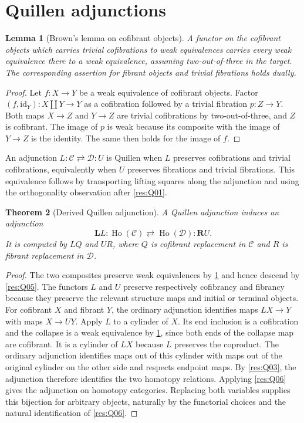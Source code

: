 \documentclass[11pt,oneside,openany]{book}
\newtheorem{theorem}{Theorem}[chapter]
\newtheorem{lemma}[theorem]{Lemma}
\theoremstyle{definition}
\theoremstyle{remark}
\begin{document}
\section{Quillen adjunctions}

\begin{lemma}[Brown's lemma on cofibrant objects]\label{res:Q07}
A functor on the cofibrant objects which carries trivial
cofibrations to weak equivalences carries every weak
equivalence there to a weak equivalence, assuming two-out-of-three
in the target. The corresponding assertion for fibrant
objects and trivial fibrations holds dually.
\end{lemma}
\begin{proof}
Let \(f:X\to Y\) be a weak equivalence of cofibrant objects.
Factor \((f,\mathrm{id}_Y):X\amalg Y\to Y\) as a
cofibration followed by a trivial fibration \(p:Z\to Y\).
Both maps \(X\to Z\) and \(Y\to Z\) are trivial
cofibrations by two-out-of-three, and \(Z\) is cofibrant.
The image of \(p\) is weak because its composite with
the image of \(Y\to Z\) is the identity. The same then
holds for the image of \(f\).
\end{proof}

An adjunction \(L:\mathcal C\rightleftarrows\mathcal D:U\)
is Quillen when \(L\) preserves cofibrations and trivial
cofibrations, equivalently when \(U\) preserves fibrations
and trivial fibrations. This equivalence follows by
transporting lifting squares along the adjunction and
using the orthogonality observation after \ref{res:Q01}.

\begin{theorem}[Derived Quillen adjunction]\label{res:Q08}
A Quillen adjunction induces an adjunction
\[
 \mathbf L L:\operatorname{Ho}(\mathcal C)
 \rightleftarrows \operatorname{Ho}(\mathcal D):\mathbf R U.
\]
It is computed by \(LQ\) and \(UR\), where \(Q\) is
cofibrant replacement in \(\mathcal C\) and \(R\)
is fibrant replacement in \(\mathcal D\).
\end{theorem}
\begin{proof}
The two composites preserve weak equivalences by
\ref{res:Q07} and hence descend by \ref{res:Q05}.
The functors \(L\) and \(U\) preserve respectively
cofibrancy and fibrancy because they preserve the relevant
structure maps and initial or terminal objects.
For cofibrant \(X\) and fibrant \(Y\), the ordinary adjunction
identifies maps \(LX\to Y\) with maps \(X\to UY\).
Apply \(L\) to a cylinder of \(X\). Its end inclusion
is a cofibration and the collapse is a weak equivalence
by \ref{res:Q07}, since both ends of the collapse map
are cofibrant. It is a cylinder of \(LX\) because \(L\)
preserves the coproduct. The ordinary adjunction identifies
maps out of this cylinder with maps out of the original
cylinder on the other side and respects endpoint maps.
By \ref{res:Q03}, the adjunction therefore identifies
the two homotopy relations. Applying \ref{res:Q06} gives
the adjunction on homotopy categories. Replacing both
variables supplies this bijection for arbitrary objects,
naturally by the functorial choices and the natural
identification of \ref{res:Q06}.
\end{proof}
\end{document}
